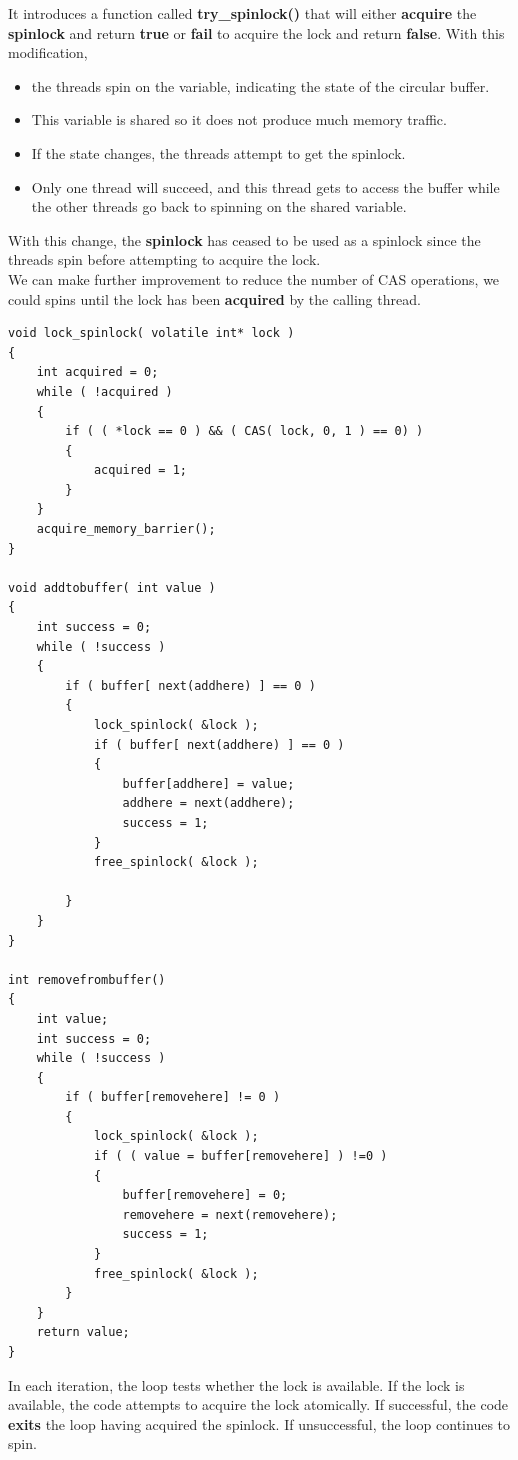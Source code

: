 \documentclass[12pt,a4paper]{report}
\begin{document}
It introduces a function called \textbf{try\_spinlock()} that will either \textbf{acquire} the \textbf{spinlock} and return \textbf{true} or \textbf{fail} to acquire the lock and return \textbf{false}. With this modification, 
\begin{itemize}
\item the threads spin on the variable, indicating the state of the circular buffer. 
\item This variable is shared so it does not produce much memory traffic. 
\item If the state changes, the threads attempt to get the spinlock.
\item Only one thread will succeed, and this thread gets to access the buffer while the other threads go back to spinning on the shared variable.
\end{itemize}
With this change, the \textbf{spinlock} has ceased to be used as a spinlock since the threads spin before attempting to acquire the lock.
\\
We can make further improvement to reduce the number of CAS operations, we could spins until the lock has been \textbf{acquired} by the calling thread.
\begin{lstlisting}
void lock_spinlock( volatile int* lock )
{
	int acquired = 0;
	while ( !acquired )
	{
		if ( ( *lock == 0 ) && ( CAS( lock, 0, 1 ) == 0) )
		{
			acquired = 1;
		}
	}
	acquire_memory_barrier();
}

void addtobuffer( int value )
{
	int success = 0;
	while ( !success )
	{
		if ( buffer[ next(addhere) ] == 0 )
		{
			lock_spinlock( &lock );
			if ( buffer[ next(addhere) ] == 0 )
			{
				buffer[addhere] = value;
				addhere = next(addhere);
				success = 1;
			}
			free_spinlock( &lock );

		}
	}
}

int removefrombuffer()
{
	int value;
	int success = 0;
	while ( !success )
	{
		if ( buffer[removehere] != 0 )
		{
			lock_spinlock( &lock );
			if ( ( value = buffer[removehere] ) !=0 )
			{
				buffer[removehere] = 0;
				removehere = next(removehere);
				success = 1;
			}
			free_spinlock( &lock );
		}
	}
	return value;
}
\end{lstlisting}
In each iteration, the loop tests whether the lock is available. If the lock is available, the code attempts to acquire the lock atomically. If successful, the code \textbf{exits} the loop having acquired the spinlock. If unsuccessful, the loop continues to spin.
\end{document}
